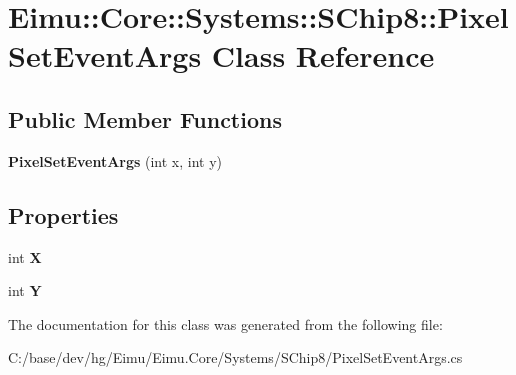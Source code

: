 \hypertarget{class_eimu_1_1_core_1_1_systems_1_1_s_chip8_1_1_pixel_set_event_args}{
\section{Eimu::Core::Systems::SChip8::PixelSetEventArgs Class Reference}
\label{class_eimu_1_1_core_1_1_systems_1_1_s_chip8_1_1_pixel_set_event_args}
}
\subsection*{Public Member Functions}
\begin{DoxyCompactItemize}
\item 
\hypertarget{class_eimu_1_1_core_1_1_systems_1_1_s_chip8_1_1_pixel_set_event_args_a14b57488b8b8ed4e3079f85b27b1f778}{
{\bfseries PixelSetEventArgs} (int x, int y)}
\label{class_eimu_1_1_core_1_1_systems_1_1_s_chip8_1_1_pixel_set_event_args_a14b57488b8b8ed4e3079f85b27b1f778}

\end{DoxyCompactItemize}
\subsection*{Properties}
\begin{DoxyCompactItemize}
\item 
\hypertarget{class_eimu_1_1_core_1_1_systems_1_1_s_chip8_1_1_pixel_set_event_args_afca619220bb8ef0369da5d26b336b94a}{
int {\bfseries X}}
\label{class_eimu_1_1_core_1_1_systems_1_1_s_chip8_1_1_pixel_set_event_args_afca619220bb8ef0369da5d26b336b94a}

\item 
\hypertarget{class_eimu_1_1_core_1_1_systems_1_1_s_chip8_1_1_pixel_set_event_args_af71c4fe6848bba0f9321a4babab8a531}{
int {\bfseries Y}}
\label{class_eimu_1_1_core_1_1_systems_1_1_s_chip8_1_1_pixel_set_event_args_af71c4fe6848bba0f9321a4babab8a531}

\end{DoxyCompactItemize}


The documentation for this class was generated from the following file:\begin{DoxyCompactItemize}
\item 
C:/base/dev/hg/Eimu/Eimu.Core/Systems/SChip8/PixelSetEventArgs.cs\end{DoxyCompactItemize}

